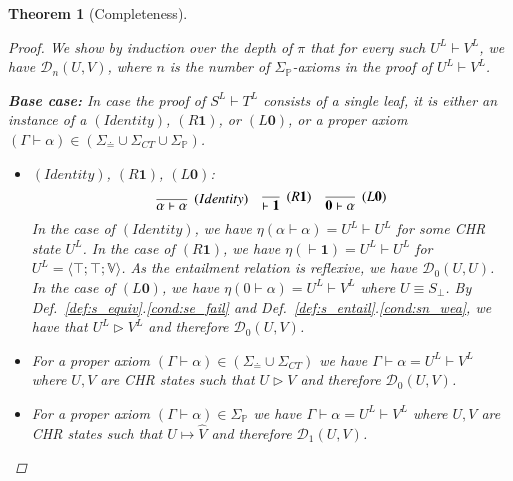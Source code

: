 \documentclass[acmtocl]{acmtrans2m}
\newtheorem{theorem}{Theorem}[section]
\newcommand\state[1]{\langle #1 \rangle}
\newcommand\ent{\rhd}
\newcommand{\V}{\ensuremath{\mathbb{V}}}
\newcommand{\cD}{\ensuremath{\mathcal{D}}}
\newcommand{\Sct}{\ensuremath{\Sigma_{CT}}}
\newcommand{\Seq}{\ensuremath{\Sigma_{\doteq}}}
\newcommand{\Sp}{\ensuremath{\Sigma_\mathbb{P}}}
\newcommand{\lone}{\boldsymbol{1}}
\newcommand{\lzero}{\boldsymbol{0}}
\begin{document}
\begin{theorem}[Completeness]
\begin{proof}
	We show by induction over the depth of $\pi$ that for every such
	$U^L\vdash V^L$, we have $\cD_n(U,V)$, where $n$ is the number of
	$\Sp$-axioms in the proof of $U^L\vdash V^L$.

	\textbf{Base case:}
	In case the proof of $S^L\vdash T^L$ consists of a single leaf, it is either an
	instance of a $(Identity)$, $(R\lone)$, or $(L\lzero)$, or a proper axiom
	$(\Gamma\vdash\alpha)\in(\Seq\cup\Sct\cup\Sp)$.

	\begin{itemize}
	    \item $(Identity)$, $(R\lone)$, $(L\lzero)$:
	    	\[
	 			\infer[(Identity)]
					{\alpha\vdash\alpha}
					{}
				\quad
				\infer[(R\lone)]
					{\vdash\lone}
					{}
				\quad
				\infer[(L\lzero)]
					{\lzero\vdash\alpha}
					{}
			\]
	    In the case of $(Identity)$, we have $\eta(\alpha\vdash\alpha)=U^L\vdash
	    U^L$ for some CHR state $U^L$. In the case of $(R\lone)$, we have
	    $\eta(\vdash\lone)=U^L\vdash U^L$ for $U^L=\state{\top;\top;\V}$. As the
	    entailment relation is reflexive, we have $\cD_0(U,U)$. In the case of
	    $(L\lzero)$, we have $\eta(0\vdash\alpha)=U^L\vdash V^L$ where $U\equiv S_\bot$.
	    By  Def.~\ref{def:s_equiv}.\ref{cond:se_fail} and
	    Def.~\ref{def:s_entail}.\ref{cond:sn_wea}, we have that $U^L\ent V^L$ and
	    therefore $\cD_0(U,V)$.

		\item For a proper axiom $(\Gamma\vdash\alpha)\in(\Seq\cup\Sct)$ we have
		$\Gamma\vdash\alpha=U^L\vdash V^L$ where $U,V$ are CHR states such
		that $U\ent V$ and therefore $\cD_0(U,V)$.

		\item For a proper axiom $(\Gamma\vdash\alpha)\in\Sp$ we have
		$\Gamma\vdash\alpha=U^L\vdash V^L$ where $U,V$ are CHR states such that
		$U\mapsto \hat V$ and therefore $\cD_1(U,V)$.
	\end{itemize}


\end{proof}
\end{theorem}
\end{document}
